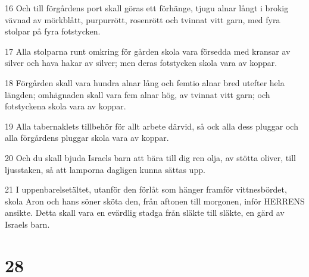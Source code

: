 \par 16 Och till förgårdens port skall göras ett förhänge, tjugu alnar långt i brokig vävnad av mörkblått, purpurrött, rosenrött och tvinnat vitt garn, med fyra stolpar på fyra fotstycken.
\par 17 Alla stolparna runt omkring för gården skola vara försedda med kransar av silver och hava hakar av silver; men deras fotstycken skola vara av koppar.
\par 18 Förgården skall vara hundra alnar lång och femtio alnar bred utefter hela längden; omhägnaden skall vara fem alnar hög, av tvinnat vitt garn; och fotstyckena skola vara av koppar.
\par 19 Alla tabernaklets tillbehör för allt arbete därvid, så ock alla dess pluggar och alla förgårdens pluggar skola vara av koppar.
\par 20 Och du skall bjuda Israels barn att bära till dig ren olja, av stötta oliver, till ljusstaken, så att lamporna dagligen kunna sättas upp.
\par 21 I uppenbarelsetältet, utanför den förlåt som hänger framför vittnesbördet, skola Aron och hans söner sköta den, från aftonen till morgonen, inför HERRENS ansikte. Detta skall vara en evärdlig stadga från släkte till släkte, en gärd av Israels barn.

\chapter{28}

